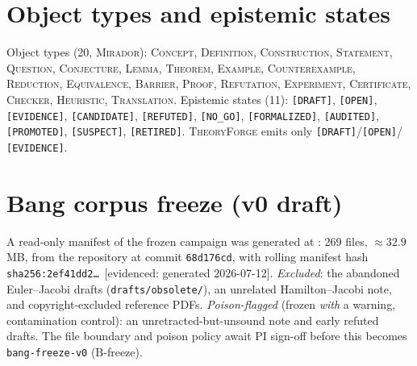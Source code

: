 \documentclass[11pt]{amsart}
\theoremstyle{definition}
\theoremstyle{remark}
\newcommand{\mirador}{\textsc{Mirador}}
\newcommand{\tf}{\textsc{TheoryForge}}
\newcommand{\state}[1]{\texttt{[#1]}}
\newcommand{\otype}[1]{\textsc{#1}}
\newcommand{\ev}[1]{\textsf{\footnotesize[#1]}} %
\begin{document}
\section{Object types and epistemic states}\label{app:states}
Object types (20, \mirador{}): \otype{Concept}, \otype{Definition},
\otype{Construction}, \otype{Statement}, \otype{Question}, \otype{Conjecture},
\otype{Lemma}, \otype{Theorem}, \otype{Example}, \otype{Counterexample},
\otype{Reduction}, \otype{Equivalence}, \otype{Barrier}, \otype{Proof},
\otype{Refutation}, \otype{Experiment}, \otype{Certificate}, \otype{Checker},
\otype{Heuristic}, \otype{Translation}. Epistemic states (11): \state{DRAFT},
\state{OPEN}, \state{EVIDENCE}, \state{CANDIDATE}, \state{REFUTED},
\state{NO\_GO}, \state{FORMALIZED}, \state{AUDITED}, \state{PROMOTED},
\state{SUSPECT}, \state{RETIRED}. \tf{} emits only \state{DRAFT}/\state{OPEN}/%
\state{EVIDENCE}.

\section{Bang corpus freeze (v0 draft)}\label{app:freeze}
A read-only manifest of the frozen campaign was generated at
: 269 files,
$\approx 32.9$\,MB, from the repository
 at commit
\texttt{68d176cd}, with rolling manifest hash
\texttt{sha256:2ef41dd2\dots}~\ev{evidenced: generated 2026-07-12}.
\emph{Excluded}: the abandoned Euler--Jacobi drafts (\texttt{drafts/obsolete/}),
an unrelated Hamilton--Jacobi note, and copyright-excluded reference PDFs.
\emph{Poison-flagged} (frozen \emph{with} a warning, contamination control):
an unretracted-but-unsound note and early refuted drafts. The file boundary and
poison policy await PI sign-off before this becomes \texttt{bang-freeze-v0}
(B-freeze).
\end{document}
